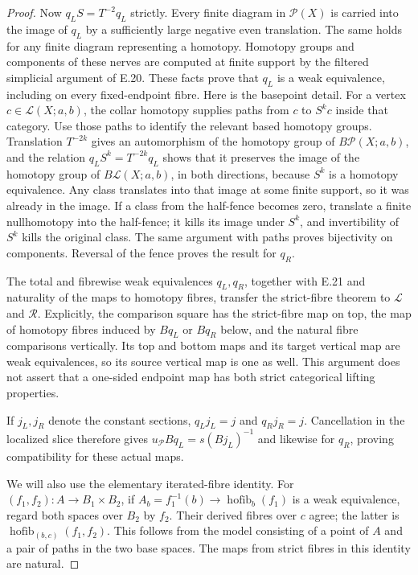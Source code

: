 \begin{proof}
Now $q_LS=T^{-2}q_L$ strictly. Every finite diagram in $\mathcal P(X)$ is carried into the image of $q_L$ by a sufficiently large negative even translation. The same holds for any finite diagram representing a homotopy. Homotopy groups and components of these nerves are computed at finite support by the filtered simplicial argument of E.20. These facts prove that $q_L$ is a weak equivalence, including on every fixed-endpoint fibre. Here is the basepoint detail. For a vertex $c\in\mathcal L(X;a,b)$, the collar homotopy supplies paths from $c$ to $S^kc$ inside that category. Use those paths to identify the relevant based homotopy groups. Translation $T^{-2k}$ gives an automorphism of the homotopy group of $B\mathcal P(X;a,b)$, and the relation $q_LS^k=T^{-2k}q_L$ shows that it preserves the image of the homotopy group of $B\mathcal L(X;a,b)$, in both directions, because $S^k$ is a homotopy equivalence. Any class translates into that image at some finite support, so it was already in the image. If a class from the half-fence becomes zero, translate a finite nullhomotopy into the half-fence; it kills its image under $S^k$, and invertibility of $S^k$ kills the original class. The same argument with paths proves bijectivity on components. Reversal of the fence proves the result for $q_R$.

The total and fibrewise weak equivalences $q_L,q_R$, together with E.21 and naturality of the maps to homotopy fibres, transfer the strict-fibre theorem to $\mathcal L$ and $\mathcal R$. Explicitly, the comparison square has the strict-fibre map on top, the map of homotopy fibres induced by $Bq_L$ or $Bq_R$ below, and the natural fibre comparisons vertically. Its top and bottom maps and its target vertical map are weak equivalences, so its source vertical map is one as well. This argument does not assert that a one-sided endpoint map has both strict categorical lifting properties.

If $j_L,j_R$ denote the constant sections, $q_Lj_L=j$ and $q_Rj_R=j$. Cancellation in the localized slice therefore gives $u_{\mathcal P}Bq_L=s(Bj_L)^{-1}$ and likewise for $q_R$, proving compatibility for these actual maps.

We will also use the elementary iterated-fibre identity. For $(f_1,f_2):A\to B_1\times B_2$, if $A_b=f_1^{-1}(b)\to\operatorname{hofib}_b(f_1)$ is a weak equivalence, regard both spaces over $B_2$ by $f_2$. Their derived fibres over $c$ agree; the latter is $\operatorname{hofib}_{(b,c)}(f_1,f_2)$. This follows from the model consisting of a point of $A$ and a pair of paths in the two base spaces. The maps from strict fibres in this identity are natural.
\end{proof}


